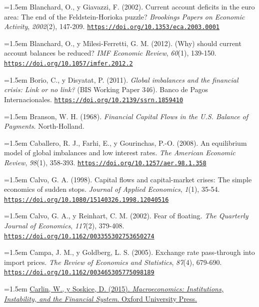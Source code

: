 \documentclass[10pt,a4paper]{article}
\begin{document}
\noindent\hangindent=1.5em Blanchard, O., y Giavazzi, F. (2002). Current account deficits in the euro area: The end of the Feldstein-Horioka puzzle? \textit{Brookings Papers on Economic Activity}, \textit{2002}(2), 147-209. \href{https://doi.org/10.1353/eca.2003.0001}{\nolinkurl{https://doi.org/10.1353/eca.2003.0001}}

\noindent\hangindent=1.5em Blanchard, O., y Milesi-Ferretti, G. M. (2012). (Why) should current account balances be reduced? \textit{IMF Economic Review}, \textit{60}(1), 139-150. \href{https://doi.org/10.1057/imfer.2012.2}{\nolinkurl{https://doi.org/10.1057/imfer.2012.2}}

\noindent\hangindent=1.5em Borio, C., y Disyatat, P. (2011). \textit{Global imbalances and the financial crisis: Link or no link?} (BIS Working Paper 346). Banco de Pagos Internacionales. \href{https://doi.org/10.2139/ssrn.1859410}{\nolinkurl{https://doi.org/10.2139/ssrn.1859410}}

\noindent\hangindent=1.5em Branson, W. H. (1968). \textit{Financial Capital Flows in the U.S. Balance of Payments}. North-Holland.

\noindent\hangindent=1.5em Caballero, R. J., Farhi, E., y Gourinchas, P.-O. (2008). An equilibrium model of global imbalances and low interest rates. \textit{The American Economic Review}, \textit{98}(1), 358-393. \href{https://doi.org/10.1257/aer.98.1.358}{\nolinkurl{https://doi.org/10.1257/aer.98.1.358}}

\noindent\hangindent=1.5em Calvo, G. A. (1998). Capital flows and capital-market crises: The simple economics of sudden stops. \textit{Journal of Applied Economics}, \textit{1}(1), 35-54. \href{https://doi.org/10.1080/15140326.1998.12040516}{\nolinkurl{https://doi.org/10.1080/15140326.1998.12040516}}

\noindent\hangindent=1.5em Calvo, G. A., y Reinhart, C. M. (2002). Fear of floating. \textit{The Quarterly Journal of Economics}, \textit{117}(2), 379-408. \href{https://doi.org/10.1162/003355302753650274}{\nolinkurl{https://doi.org/10.1162/003355302753650274}}

\noindent\hangindent=1.5em Campa, J. M., y Goldberg, L. S. (2005). Exchange rate pass-through into import prices. \textit{The Review of Economics and Statistics}, \textit{87}(4), 679-690. \href{https://doi.org/10.1162/003465305775098189}{\nolinkurl{https://doi.org/10.1162/003465305775098189}}

\noindent\hangindent=1.5em \href{https://global.oup.com/academic/product/macroeconomics-9780199655793}{Carlin, W., y Soskice, D. (2015). \textit{Macroeconomics: Institutions, Instability, and the Financial System}. Oxford University Press.}
\end{document}
